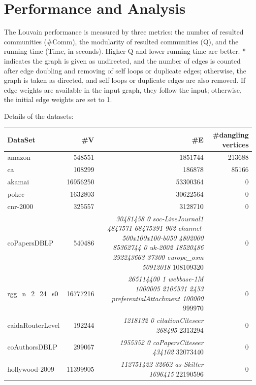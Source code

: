 \documentclass[10pt,article,oneside]{memoir}
\begin{document}
\section{Performance and Analysis}\label{performance-and-analysis-1}

The Louvain performance is measured by three metrics: the number of
resulted communities (\#Comm), the modularity of resulted communities
(Q), and the running time (Time, in seconds). Higher Q and lower running
time are better. * indicates the graph is given as undirected, and the
number of edges is counted after edge doubling and removing of self
loops or duplicate edges; otherwise, the graph is taken as directed, and
self loops or duplicate edges are also removed. If edge weights are
available in the input graph, they follow the input; otherwise, the
initial edge weights are set to 1.

Details of the datasets:

\begin{longtable}[c]{@{}lrrr@{}}
\toprule
DataSet & \#V & \#E & \#dangling vertices\tabularnewline
\midrule
\endhead
amazon & 548551 & 1851744 & 213688\tabularnewline
ca & 108299 & 186878 & 85166\tabularnewline
akamai & 16956250 & 53300364 & 0\tabularnewline
pokec & 1632803 & 30622564 & 0\tabularnewline
cnr-2000 & 325557 & 3128710 & 0\tabularnewline
coPapersDBLP & 540486 & \emph{30481458 \textbar{} 0 \textbar{}
\textbar{} soc-LiveJournal1 \textbar{} 4847571 \textbar{} 68475391
\textbar{} 962 \textbar{} \textbar{} channel-500x100x100-b050 \textbar{}
4802000 \textbar{} 85362744 \textbar{} 0 \textbar{} \textbar{} uk-2002
\textbar{} 18520486 \textbar{} 292243663 \textbar{} 37300 \textbar{}
\textbar{} europe\_osm \textbar{} 50912018 \textbar{} }108109320 &
0\tabularnewline
rgg\_n\_2\_24\_s0 & 16777216 & \emph{265114400 \textbar{} 1 \textbar{}
\textbar{} webbase-1M \textbar{} 1000005 \textbar{} 2105531 \textbar{}
2453 \textbar{} \textbar{} preferentialAttachment \textbar{} 100000
\textbar{} }999970 & 0\tabularnewline
caidaRouterLevel & 192244 & \emph{1218132 \textbar{} 0 \textbar{}
\textbar{} citationCiteseer \textbar{} 268495 \textbar{} }2313294 &
0\tabularnewline
coAuthorsDBLP & 299067 & \emph{1955352 \textbar{} 0 \textbar{}
\textbar{} coPapersCiteseer \textbar{} 434102 \textbar{} }32073440 &
0\tabularnewline
hollywood-2009 & 11399905 & \emph{112751422 \textbar{} 32662 \textbar{}
\textbar{} as-Skitter \textbar{} 1696415 \textbar{} }22190596 &
0\tabularnewline
\bottomrule
\end{longtable}
\end{document}
